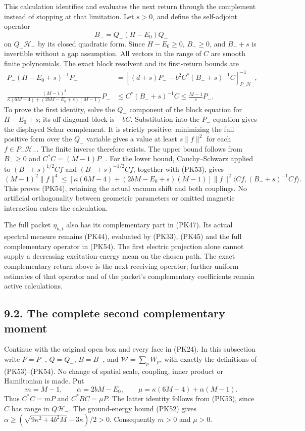 \documentclass[11pt]{article}
\begin{document}
This calculation identifies and evaluates the next return through the
complement instead of stopping at that limitation. Let \(s>0\), and define
the self-adjoint operator
\[
 B_-=Q_-(H-E_0)Q_-
\]
on \(Q_-\mathcal H_-\) by its closed quadratic form. Since \(H-E_0\ge0\),
\(B_-\ge0\), and \(B_-+s\) is invertible without a gap assumption. All
vectors in the range of \(C\) are smooth finite polynomials. The exact
block resolvent and its first-return bounds are
\[
 \begin{aligned}
 P_-(H-E_0+s)^{-1}P_-
 &=\left[(d+s)P_--b^2 C^*(B_-+s)^{-1}C\right]^{-1}_{P_-\mathcal H_-},\\
 \frac{(M-1)^2}
 {\kappa(6M-4)+(2bM-E_0+s)(M-1)}P_-
 &\le C^*(B_-+s)^{-1}C\le\frac{M-1}{s}P_-.
 \end{aligned}\tag{PK54}
\]
To prove the first identity, solve the \(Q_-\) component of the block
equation for \(H-E_0+s\); its off-diagonal block is \(-bC\).
Substitution into the \(P_-\) equation gives the displayed Schur
complement. It is strictly positive: minimizing the full positive form
over the \(Q_-\) variable gives a value at least \(s\|f\|^2\) for
each \(f\in P_-\mathcal H_-\). The finite inverse therefore exists.
The upper bound follows from \(B_-\ge0\) and \(C^*C=(M-1)P_-\).
For the lower bound, Cauchy–Schwarz applied to
\((B_-+s)^{1/2}Cf\) and \((B_-+s)^{-1/2}Cf\), together with (PK53), gives
\[
 (M-1)^2\|f\|^4\le
 \left[\kappa(6M-4)+(2bM-E_0+s)(M-1)\right]\|f\|^2
 \langle Cf,(B_-+s)^{-1}Cf\rangle.
\]
This proves (PK54), retaining the actual vacuum shift and both couplings.
No artificial orthogonality between geometric parameters or omitted
magnetic interaction enters the calculation.

The full packet \(\eta_{h,t}\) also has its complementary part in
(PK47). Its actual spectral measure remains (PK44), evaluated by (PK33),
(PK45) and the full complementary operator in (PK54). The first electric
projection alone cannot supply a decreasing excitation-energy mean on the
chosen path. The exact complementary return above is the next receiving
operator; further uniform estimates of that operator and of the packet's
complementary coefficients remain active calculations.

\subsection*{9.2. The complete second complementary moment}

Continue with the original open box and every face in (PK24). In this
subsection write \(P=P_-\), \(Q=Q_-\), \(B=B_-\), and
\(\mathcal W=\sum_pW_p\), with exactly the definitions of (PK53)–(PK54).
No change of spatial scale, coupling, inner product or Hamiltonian is made.
Put
\[
 m=M-1,\qquad \alpha=2bM-E_0,\qquad
 \mu=\kappa(6M-4)+\alpha(M-1).
 \tag{PK55}
\]
Thus \(C^*C=mP\) and \(C^*BC=\mu P\). The latter identity follows
from (PK53), since \(C\) has range in \(Q\mathcal H_-\).
The ground-energy bound (PK52) gives
\(\alpha\ge(\sqrt{9\kappa^2+4b^2M}-3\kappa)/2>0\).
Consequently \(m>0\) and \(\mu>0\).
\end{document}
